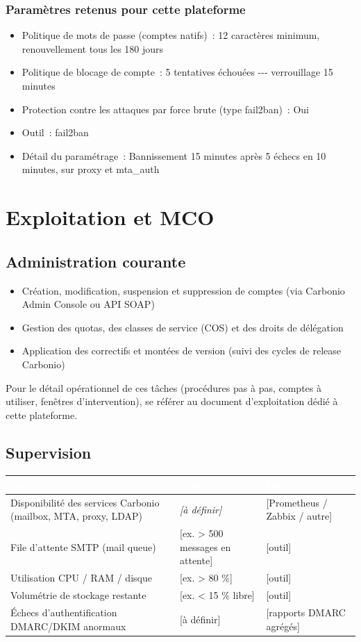 \documentclass[11pt,a4paper]{report}
\newcommand{\placeholder}[1]{\textit{\textcolor{placeholdercol}{[#1]}}\par\vspace{4pt}}
\newcommand{\tblhead}[1]{\textcolor{white}{\textbf{#1}}}
\begin{document}
\subsection{Paramètres retenus pour cette plateforme}
\begin{itemize}[nosep]
  \item Politique de mots de passe (comptes natifs)~: 12 caractères minimum, renouvellement tous les 180 jours
  \item Politique de blocage de compte~: 5 tentatives échouées -\allowbreak{}-\allowbreak{}-\allowbreak{} verrouillage 15 minutes
  \item Protection contre les attaques par force brute (type fail2ban)~: Oui
  \item Outil~: fail2ban
  \item Détail du paramétrage~: Bannissement 15 minutes après 5 échecs en 10 minutes, sur proxy et mta\_auth
\end{itemize}

\chapter{Exploitation et MCO}

\section{Administration courante}
\begin{itemize}[nosep]
  \item Création, modification, suspension et suppression de comptes (via Carbonio Admin Console ou API SOAP)
  \item Gestion des quotas, des classes de service (COS) et des droits de délégation
  \item Application des correctifs et montées de version (suivi des cycles de release Carbonio)
\end{itemize}
Pour le détail opérationnel de ces tâches (procédures pas à pas, comptes à utiliser, fenêtres d'intervention), se référer au document d'exploitation dédié à cette plateforme.

\section{Supervision}
\begin{longtable}{|p{5cm}|p{4cm}|p{3.5cm}|}
\hline
\rowcolor{primary}\tblhead{Indicateur} & \tblhead{Seuil d'alerte} & \tblhead{Outil} \\
\hline
\endhead
Disponibilité des services Carbonio (mailbox, MTA, proxy, LDAP) & \placeholder{à définir} & [Prometheus / Zabbix / autre] \\
\hline
File d'attente SMTP (mail queue) & [ex. > 500 messages en attente] & [outil] \\
\hline
Utilisation CPU / RAM / disque & [ex. > 80 \%] & [outil] \\
\hline
Volumétrie de stockage restante & [ex. < 15 \% libre] & [outil] \\
\hline
Échecs d'authentification DMARC/DKIM anormaux & [à définir] & [rapports DMARC agrégés] \\
\hline
\end{longtable}
\end{document}
